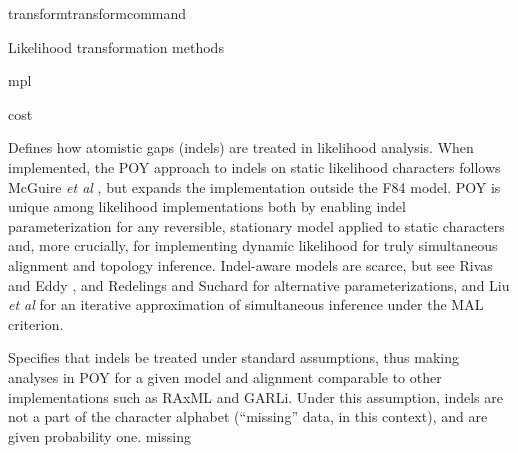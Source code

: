 \begin{command}{transform}{transformcommand}
\begin{arguments}
\begin{argumentgroup}{Likelihood transformation methods}
{\begin{description}
{   %
                            }
                            {mpl}

                    \end{description}}
                    {cost}

                    {Defines how atomistic gaps (indels) are treated in
                    likelihood analysis. When implemented, the POY approach to
                    indels on static likelihood characters follows McGuire \emph{et al} 
                    \cite{mcguire2001models}, but expands the implementation outside the F84
                    model. POY is unique among likelihood implementations both
                    by enabling indel parameterization for any reversible,
                    stationary model applied to static characters and, more
                    crucially, for implementing dynamic likelihood for truly
                    simultaneous alignment and topology inference. Indel-aware
                    models are scarce, but see Rivas and Eddy \cite{rivas2008probabilistic}, 
                    and Redelings and Suchard \cite{redelings2005joint,redelings2007incorporating}
                    for alternative parameterizations,
                    and Liu \emph{et al} \cite{liu2009rapid,liusateII2012} for an iterative approximation of
                    simultaneous inference under the MAL criterion.

                    \begin{description}

                            {Specifies that indels be treated under standard
                            assumptions, thus making analyses in POY for a given
                            model and alignment comparable to other
                            implementations such as RAxML and GARLi. Under this
                            assumption, indels are not a part of the character
                            alphabet (``missing'' data, in this context), and
                            are given probability one.}
                            {missing}


\end{description}}
\end{argumentgroup}
\end{arguments}
\end{command}
